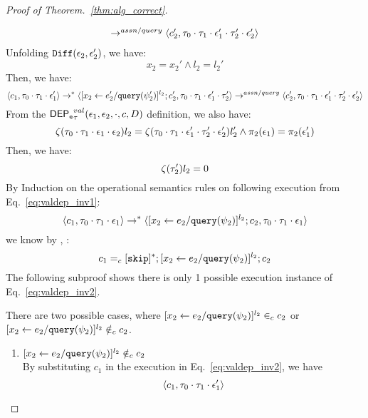 \begin{proof}[Proof of Theorem.~\ref{thm:alg_correct}]
\begin{case}[$P(\cdot)$]
\[\begin{array}{l}
  \rightarrow^{assn/query} 
  \langle {c}_2',  \mathtt{\tau}_0 \cdot \mathtt{\tau}_1 \cdot \mathtt{\epsilon}_1' \cdot \mathtt{\tau}_2' \cdot \mathtt{\epsilon}_2' \rangle 
\end{array}
 \]
%
Unfolding $\mathtt{Diff}(\mathtt{\epsilon}_2,\mathtt{\epsilon}_2')$, we have:
\[
  x_2 = x_2' \land l_2 = l_2' 
\] 
%
Then, we have:
\begin{equation}
\label{eq:valdep_inv2}
  \langle c_1, \mathtt{\tau}_0 \cdot \mathtt{\tau}_1 \cdot \mathtt{\epsilon}_1' \rangle 
  \rightarrow^{*} 
  \langle [\mathrel{ {x}_2 \leftarrow e_2' / {\tt query}(\psi_2') }]^{l_2} ; {c}_2', \mathtt{\tau}_0 \cdot \mathtt{\tau}_1 \cdot \mathtt{\epsilon}_1' \cdot \mathtt{\tau}_2' \rangle 
  \rightarrow^{assn/query} 
  \langle {c}_2',  \mathtt{\tau}_0 \cdot \mathtt{\tau}_1 \cdot \mathtt{\epsilon}_1' \cdot \mathtt{\tau}_2' \cdot \mathtt{\epsilon}_2' \rangle 
\end{equation}
%
From the $\mathsf{DEP_{\mathtt{e}}}^{val}_{\mathtt{\tau}}(\mathtt{\epsilon}_1, \mathtt{\epsilon}_2, \cdot, c, D)$ definition, we also have:
\[
  \mathtt{\zeta}(\mathtt{\tau}_0 \cdot \mathtt{\tau}_1 \cdot \mathtt{\epsilon}_1 \cdot \mathtt{\epsilon}_2) l_2 = 
  \mathtt{\zeta}(\mathtt{\tau}_0 \cdot \mathtt{\tau}_1 \cdot \mathtt{\epsilon}_1' \cdot \mathtt{\tau}_2' \cdot \mathtt{\epsilon}_2') l_2'
  \land 
  \pi_2(\mathtt{\epsilon}_1) = \pi_2(\mathtt{\epsilon}_1')
\] 
Then, we have:
\begin{equation}
\label{eq:valdep_invn}
  \mathtt{\zeta}(\mathtt{\tau}_2') l_2 = 0
\end{equation}
%
%
%
 By Induction on the operational semantics rules on following execution from Eq.~\ref{eq:valdep_inv1}:
 \[\langle c_1, \mathtt{\tau}_0 \cdot \mathtt{\tau}_1 \cdot \mathtt{\epsilon}_1 \rangle
  \rightarrow^{*} 
  \langle [\mathrel{ {x}_2 \leftarrow e_2 / {\tt query}(\psi_2) }]^{l_2};{c}_2, 
  \mathtt{\tau}_0 \cdot \mathtt{\tau}_1 \cdot \mathtt{\epsilon}_1 \rangle \]
 we know by  , :
 \[
 c_1 =_c 
 [\mathtt{skip}]{}^*;[\mathrel{ {x}_2 \leftarrow e_2 / {\tt query}(\psi_2) }]^{l_2};{c}_2
 \]
The following subproof shows there is only 1 possible execution instance of Eq.~\ref{eq:valdep_inv2}.
\begin{subproof}[Subproof]
\label{pf:noiteration_inv2}
There are two possible cases, 
where $[\mathrel{ {x}_2 \leftarrow e_2 / {\tt query}(\psi_2) }]^{l_2} \in_c c_2$ 
or $[\mathrel{ {x}_2 \leftarrow e_2 / {\tt query}(\psi_2) }]^{l_2} \notin_c c_2$.
%
\begin{enumerate}
\item{$[\mathrel{ {x}_2 \leftarrow e_2 / {\tt query}(\psi_2) }]^{l_2}\notin_c c_2$}
\\
By substituting $c_1$ in the execution in Eq.~\ref{eq:valdep_inv2}, we have 
  \[
  \langle c_1, \mathtt{\tau}_0 \cdot \mathtt{\tau}_1 \cdot \mathtt{\epsilon}_1' \rangle 
\]
\end{enumerate}
\end{subproof}
\end{case}
\end{proof}
